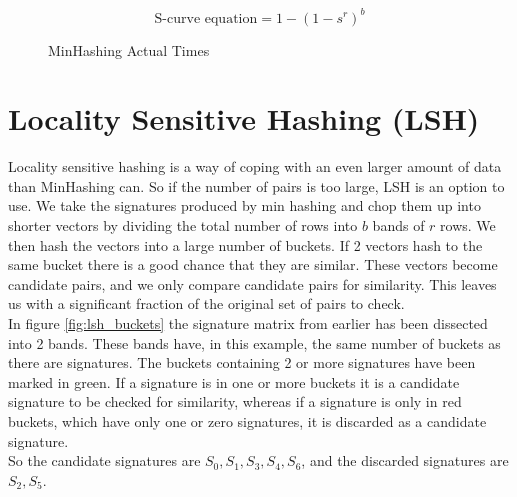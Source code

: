 \documentclass[a4paper,11pt]{article}
\begin{document}
\begin{figure}[!htpb]
    \begin{center}
        
        \caption{MinHashing Actual Times}
        \label{fig:minhashing_at}
    \end{center}
\begin{equation}
    \text {S-curve equation} = 1 - (1 - s^r)^b 
\end{equation}
\end{figure}


\section{Locality Sensitive Hashing (LSH)}
Locality sensitive hashing is a way of coping with an even larger amount of data than MinHashing can. So if the number of pairs is too large, LSH is an option to use. We take the signatures produced by min hashing and chop them up into shorter vectors by dividing the total number of rows into $b$ bands of $r$ rows. We then hash the vectors into a large number of buckets. If 2 vectors hash to the same bucket there is a good chance that they are similar. These vectors become candidate pairs, and we only compare candidate pairs for similarity. This leaves us with a significant fraction of the original set of pairs to check. \\

In figure \ref{fig:lsh_buckets} the signature matrix from earlier has been dissected into 2 bands. These bands have, in this example, the same number of buckets as there are signatures. The buckets containing 2 or more signatures have been marked in green. If a signature is in one or more buckets it is a candidate signature to be checked for similarity, whereas if a signature is only in red buckets, which have only one or zero signatures, it is discarded as a candidate signature. \\

So the candidate signatures are $S_0, S_1, S_3, S_4, S_6$, and the discarded signatures are $S_2, S_5$.
\end{document}
